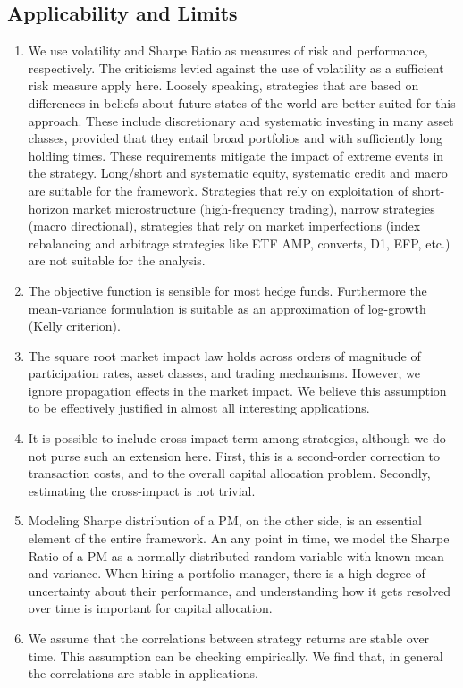 \documentclass[11pt]{gappyarticle}
\begin{document}
\subsection{Applicability and Limits}
\begin{enumerate} 
	\item We use volatility and Sharpe Ratio as measures of risk and performance, respectively. The criticisms levied against the use of volatility as a sufficient risk measure apply here. Loosely speaking, strategies that are based on differences in beliefs about future states of the world are better suited for this approach. These include discretionary and systematic investing in many asset classes, provided that they  entail broad portfolios and with sufficiently long holding times. These requirements mitigate the impact of extreme events in the strategy. Long/short and systematic equity, systematic credit and macro are suitable for the framework. Strategies that rely on exploitation of short-horizon market microstructure (high-frequency trading), narrow strategies (macro directional), strategies that rely on market imperfections (index rebalancing and arbitrage strategies like ETF AMP, converts, D1, EFP, etc.) are not suitable for the analysis.
	\item The objective function is sensible for most hedge funds. Furthermore the mean-variance formulation is suitable as an approximation of log-growth (Kelly criterion).
	\item The square root market impact law holds across orders of magnitude of participation rates, asset classes, and trading mechanisms. However, we ignore propagation effects in the market impact. We believe this assumption to be effectively justified in almost all interesting applications.
	\item It is possible to include cross-impact term among strategies, although we do not purse such an extension here. First, this is a second-order correction to transaction costs, and to the overall capital allocation problem. Secondly, estimating the cross-impact is not trivial.
	\item Modeling Sharpe distribution of a PM, on the other side, is an essential element of the entire framework.  An any point in time, we model the Sharpe Ratio of a PM as a normally distributed random variable with known mean and variance. When hiring a portfolio manager, there is a high degree of uncertainty about their performance, and understanding how it gets resolved over time is important for capital allocation.
	\item We assume that the correlations between strategy returns are stable over time. This assumption can be checking empirically. We find that, in general the correlations are stable in applications.
	\end{enumerate}
\end{document}
